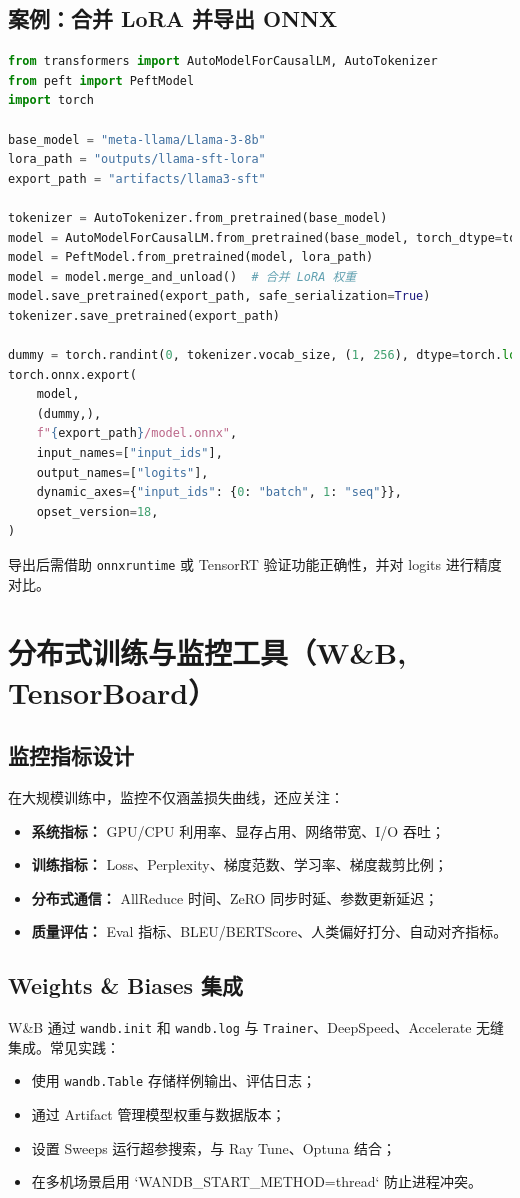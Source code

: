 \documentclass[UTF8,zihao=-4]{ctexart}
\begin{document}
\subsection{案例：合并 LoRA 并导出 ONNX}
\begin{lstlisting}[language=Python,caption={合并 LoRA 并导出 ONNX 推理图}]
from transformers import AutoModelForCausalLM, AutoTokenizer
from peft import PeftModel
import torch

base_model = "meta-llama/Llama-3-8b"
lora_path = "outputs/llama-sft-lora"
export_path = "artifacts/llama3-sft"

tokenizer = AutoTokenizer.from_pretrained(base_model)
model = AutoModelForCausalLM.from_pretrained(base_model, torch_dtype=torch.float16)
model = PeftModel.from_pretrained(model, lora_path)
model = model.merge_and_unload()  # 合并 LoRA 权重
model.save_pretrained(export_path, safe_serialization=True)
tokenizer.save_pretrained(export_path)

dummy = torch.randint(0, tokenizer.vocab_size, (1, 256), dtype=torch.long)
torch.onnx.export(
    model,
    (dummy,),
    f"{export_path}/model.onnx",
    input_names=["input_ids"],
    output_names=["logits"],
    dynamic_axes={"input_ids": {0: "batch", 1: "seq"}},
    opset_version=18,
)
\end{lstlisting}
导出后需借助 \texttt{onnxruntime} 或 TensorRT 验证功能正确性，并对 logits 进行精度对比。

\section{分布式训练与监控工具（W\&B, TensorBoard）}
\subsection{监控指标设计}
在大规模训练中，监控不仅涵盖损失曲线，还应关注：
\begin{itemize}
  \item \textbf{系统指标：} GPU/CPU 利用率、显存占用、网络带宽、I/O 吞吐；
  \item \textbf{训练指标：} Loss、Perplexity、梯度范数、学习率、梯度裁剪比例；
  \item \textbf{分布式通信：} AllReduce 时间、ZeRO 同步时延、参数更新延迟；
  \item \textbf{质量评估：} Eval 指标、BLEU/BERTScore、人类偏好打分、自动对齐指标。
\end{itemize}

\subsection{Weights \& Biases 集成}
W\&B 通过 \texttt{wandb.init} 和 \texttt{wandb.log} 与 \texttt{Trainer}、DeepSpeed、Accelerate 无缝集成。常见实践：
\begin{itemize}
  \item 使用 \texttt{wandb.Table} 存储样例输出、评估日志；
  \item 通过 Artifact 管理模型权重与数据版本；
  \item 设置 Sweeps 运行超参搜索，与 Ray Tune、Optuna 结合；
  \item 在多机场景启用 `WANDB_START_METHOD=thread` 防止进程冲突。
\end{itemize}
\end{document}
